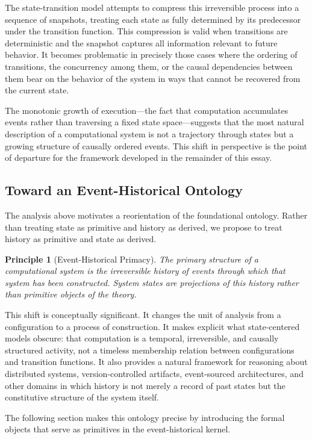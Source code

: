 \documentclass[12pt]{article}
\newtheorem{principle}{Principle}
\begin{document}
The state-transition model attempts to compress this irreversible process into a sequence of snapshots, treating each state as fully determined by its predecessor under the transition function. This compression is valid when transitions are deterministic and the snapshot captures all information relevant to future behavior. It becomes problematic in precisely those cases where the ordering of transitions, the concurrency among them, or the causal dependencies between them bear on the behavior of the system in ways that cannot be recovered from the current state.

The monotonic growth of execution---the fact that computation accumulates events rather than traversing a fixed state space---suggests that the most natural description of a computational system is not a trajectory through states but a growing structure of causally ordered events. This shift in perspective is the point of departure for the framework developed in the remainder of this essay.

\subsection{Toward an Event-Historical Ontology}

The analysis above motivates a reorientation of the foundational ontology. Rather than treating state as primitive and history as derived, we propose to treat history as primitive and state as derived.

\begin{principle}[Event-Historical Primacy]
The primary structure of a computational system is the irreversible history of events through which that system has been constructed. System states are projections of this history rather than primitive objects of the theory.
\end{principle}

This shift is conceptually significant. It changes the unit of analysis from a configuration to a process of construction. It makes explicit what state-centered models obscure: that computation is a temporal, irreversible, and causally structured activity, not a timeless membership relation between configurations and transition functions. It also provides a natural framework for reasoning about distributed systems, version-controlled artifacts, event-sourced architectures, and other domains in which history is not merely a record of past states but the constitutive structure of the system itself.

The following section makes this ontology precise by introducing the formal objects that serve as primitives in the event-historical kernel.
\end{document}
